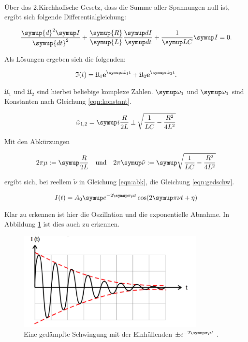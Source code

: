 Über das 2.Kirchhoffsche Gesetz, dass die Summe aller Spannungen null ist, ergibt
sich folgende Differentialgleichung:

\begin{equation}
  \frac{\symup{d}^2 \g{I}}{\symup{d t}^2} + \frac{\symup{R}}{\symup{L}}
  \frac{\g{d I}}{\g{d t}} + \frac{1}{\g{L C}} \g{I} = 0.
  \label{eqn:dgl}
\end{equation}

Als Lösungen ergeben sich die folgenden:

\begin{equation}
  \mathfrak{I}(t) = \mathfrak{U}_1 \textbf{e}^{\g{i\tilde{\omega}_1t}} + \mathfrak{U}_2
  \textbf{e}^{\g{i\tilde{\omega}_2t}}.
\end{equation}

$\mathfrak{U}_1$ und $\mathfrak{U}_2$ sind hierbei beliebige komplexe Zahlen.
$\g{\tilde{\omega}}_\text{1}$ und $\g{\tilde{\omega}}_\text{1}$ sind Konstanten nach Gleichung
\eqref{eqn:konstant}.

\begin{equation}
  \tilde{\omega}_{1,2} = \g{i\frac{R}{2 L} \pm \sqrt{\frac{1}{L C} - \frac{R^2}{4 L^2}}}
  \label{eqn:konstant}
\end{equation}

Mit den Abkürzungen

\begin{align}
  2 \pi \mu := \g{\frac{R}{2 L}} \quad \text{und} \quad 2 \pi \g{\tilde{\nu}} := \g{\sqrt{\frac{1}{L C} - \frac{R^2}{4 L^2}}}
  \label{eqn:abk}
\end{align}

ergibt sich, bei reellem $\tilde{\nu}$ in Gleichung \eqref{eqn:abk}, die Gleichung \eqref{eqn:gedschw}.

\begin{equation}
  I(t) = A_0 \g{e}^{-2 \g{\pi} \mu t} \cos(2 \g{\pi} \nu t + \eta)
  \label{eqn:gedschw}
\end{equation}

Klar zu erkennen ist hier die Oszillation und die exponentielle Abnahme.
In Abbildung \ref{fig:gedschw} ist dies auch zu erkennen.

\begin{figure}[h]
  \centering
  \includegraphics[height = 5cm]{gedschw.pdf}
  \caption{Eine gedämpfte Schwingung mit der Einhüllenden $\pm e^{-2\g{\pi}\mu t}$ \cite{anleitung}.}
  \label{fig:gedschw}
\end{figure}

